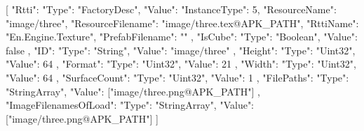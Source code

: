 [{
        "Rtti": {
            "Type": "FactoryDesc",
            "Value": {
                "InstanceType": 5,
                "ResourceName": "image/three",
                "ResourceFilename": "image/three.tex@APK_PATH",
                "RttiName": "En.Engine.Texture",
                "PrefabFilename": ""
            }
        },
        "IsCube": {
            "Type": "Boolean",
            "Value": false
        },
        "ID": {
            "Type": "String",
            "Value": "image/three"
        },
        "Height": {
            "Type": "Uint32",
            "Value": 64
        },
        "Format": {
            "Type": "Uint32",
            "Value": 21
        },
        "Width": {
            "Type": "Uint32",
            "Value": 64
        },
        "SurfaceCount": {
            "Type": "Uint32",
            "Value": 1
        },
        "FilePaths": {
            "Type": "StringArray",
            "Value": ["image/three.png@APK_PATH"]
        },
        "ImageFilenamesOfLoad": {
            "Type": "StringArray",
            "Value": ["image/three.png@APK_PATH"]
        }
    }]